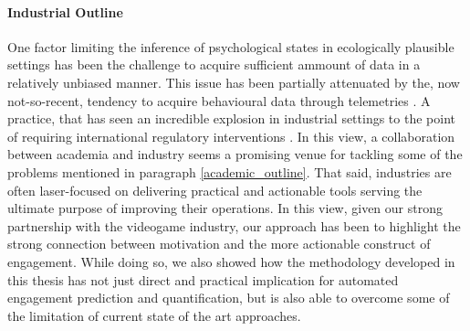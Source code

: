 \paragraph*{Industrial Outline}
\label{industrial_outline}
One factor limiting the inference of psychological states in ecologically plausible settings has been the challenge to acquire sufficient ammount of data in a relatively unbiased manner. This issue has been partially attenuated by the, now not-so-recent, tendency to acquire behavioural data through telemetries \cite{el2016game, drachen2015behavioral}. A practice, that has seen an incredible explosion in industrial settings to the point of requiring international regulatory interventions \cite{EUdataregulations2018}. In this view, a collaboration between academia and industry seems a promising venue for tackling some of the problems mentioned in paragraph \ref{academic_outline}. That said, industries are often laser-focused on delivering practical and actionable tools serving the ultimate purpose of improving their operations. In this view, given our strong partnership with the videogame industry, our approach has been to highlight the strong connection between motivation and the more actionable construct of engagement. While doing so, we also showed how the methodology developed in this thesis has not just direct and practical implication for automated engagement prediction and quantification, but is also able to overcome some of the limitation of current state of the art approaches. 
\\
\\
